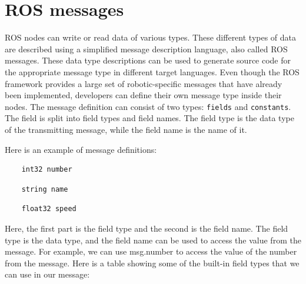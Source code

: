 \documentclass[../../main]{subfiles}
\begin{document}
\section{ROS messages}
ROS nodes can write or read data of various types. These different types of data are
described using a simplified message description language, also called ROS messages.
These data type descriptions can be used to generate source code for the appropriate
message type in different target languages.
Even though the ROS framework provides a large set of robotic-specific messages that
have already been implemented, developers can define their own message type inside their
nodes.
The message definition can consist of two types: \texttt{fields} and \texttt{constants}. The field is
split into field types and field names. The field type is the data type of the transmitting
message, while the field name is the name of it.

Here is an example of message definitions:
\begin{verbatim}
    int32 number
\end{verbatim}
\begin{verbatim}
    string name
\end{verbatim}
\begin{verbatim}
    float32 speed
\end{verbatim}
Here, the first part is the field type and the second is the field name. The field type is
the data type, and the field name can be used to access the value from the message. For
example, we can use msg.number to access the value of the number from the message.
\newpage
Here is a table showing some of the built-in field types that we can use in our message:
\end{document}
